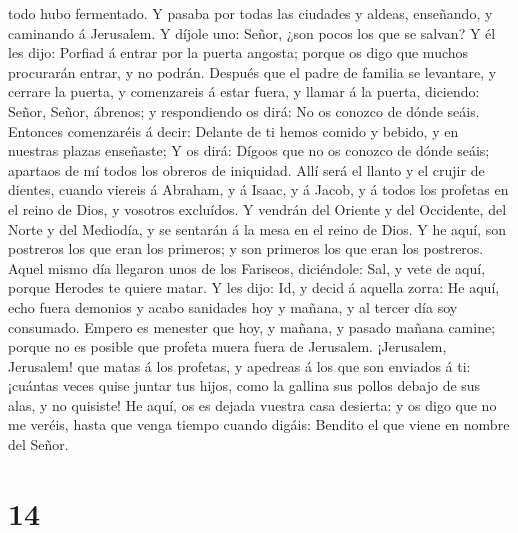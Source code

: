 todo hubo fermentado.  Y pasaba por todas las ciudades y
aldeas, enseñando, y caminando á Jerusalem.  Y díjole
uno: Señor, ¿son pocos los que se salvan? Y él les dijo: 
Porfiad á entrar por la puerta angosta; porque os digo que muchos
procurarán entrar, y no podrán.  Después que el padre de
familia se levantare, y cerrare la puerta, y comenzareis á estar fuera,
y llamar á la puerta, diciendo: Señor, Señor, ábrenos; y respondiendo os
dirá: No os conozco de dónde seáis.  Entonces comenzaréis
á decir: Delante de ti hemos comido y bebido, y en nuestras plazas
enseñaste;  Y os dirá: Dígoos que no os conozco de dónde
seáis; apartaos de mí todos los obreros de iniquidad. 
Allí será el llanto y el crujir de dientes, cuando viereis á Abraham, y
á Isaac, y á Jacob, y á todos los profetas en el reino de Dios, y
vosotros excluídos.  Y vendrán del Oriente y del
Occidente, del Norte y del Mediodía, y se sentarán á la mesa en el reino
de Dios.  Y he aquí, son postreros los que eran los
primeros; y son primeros los que eran los postreros. 
Aquel mismo día llegaron unos de los Fariseos, diciéndole: Sal, y vete
de aquí, porque Herodes te quiere matar.  Y les dijo: Id,
y decid á aquella zorra: He aquí, echo fuera demonios y acabo sanidades
hoy y mañana, y al tercer día soy consumado.  Empero es
menester que hoy, y mañana, y pasado mañana camine; porque no es posible
que profeta muera fuera de Jerusalem.  ¡Jerusalem,
Jerusalem! que matas á los profetas, y apedreas á los que son enviados á
ti: ¡cuántas veces quise juntar tus hijos, como la gallina sus pollos
debajo de sus alas, y no quisiste!  He aquí, os es dejada
vuestra casa desierta: y os digo que no me veréis, hasta que venga
tiempo cuando digáis: Bendito el que viene en nombre del Señor.

\hypertarget{section-13}{%
\section{14}\label{section-13}}

